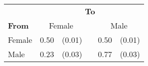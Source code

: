 
\begin{tabular}{lr@{ }r@{\,\,}cr@{ }r}
    \toprule
    & \multicolumn{5}{c}{\textbf{To}} \\
    \cmidrule(l){2-6}
    \textbf{From} & \multicolumn{2}{c}{Female} && \multicolumn{2}{c}{Male} \\
    \midrule
    Female & 0.50 & (0.01) &  & 0.50 & (0.01) \\
    Male & 0.23 & (0.03) &  & 0.77 & (0.03) \\
    \bottomrule
\end{tabular}
